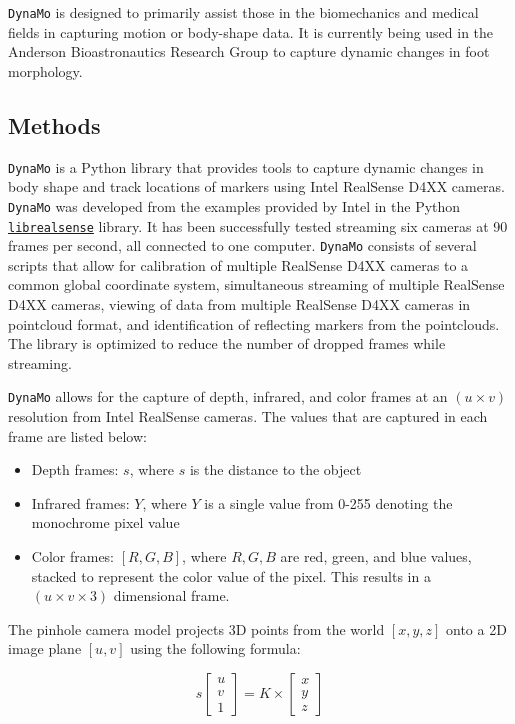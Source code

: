 \documentclass[defaultstyle,11pt]{comps}
\providecommand{\tightlist}{%
  \setlength{\itemsep}{0pt}\setlength{\parskip}{0pt}}
\begin{document}
\texttt{DynaMo} is designed to primarily assist those in the biomechanics and medical fields in capturing motion or body-shape data.
It is currently being used in the Anderson Bioastronautics Research Group to capture dynamic changes in foot morphology.

\hypertarget{methods-1}{%
\subsection{Methods}\label{methods-1}}

\texttt{DynaMo} is a Python library that provides tools to capture dynamic changes in body shape and track locations of markers using Intel RealSense D4XX cameras.
\texttt{DynaMo} was developed from the examples provided by Intel in the Python \href{https://github.com/IntelRealSense/librealsense}{\texttt{librealsense}} library. It has been successfully tested streaming six cameras at 90 frames per second, all connected to one computer.
\texttt{DynaMo} consists of several scripts that allow for calibration of multiple RealSense D4XX cameras to a common global coordinate system, simultaneous streaming of multiple RealSense D4XX cameras, viewing of data from multiple RealSense D4XX cameras in pointcloud format, and identification of reflecting markers from the pointclouds.
The library is optimized to reduce the number of dropped frames while streaming.

\texttt{DynaMo} allows for the capture of depth, infrared, and color frames at an \((u \times v)\) resolution from Intel RealSense cameras.
The values that are captured in each frame are listed below:

\begin{itemize}
\tightlist
\item
  Depth frames: \(s\), where \(s\) is the distance to the object
\item
  Infrared frames: \(Y\), where \(Y\) is a single value from 0-255 denoting the monochrome pixel value
\item
  Color frames: \([R,G,B]\), where \(R,G,B\) are red, green, and blue values, stacked to represent the color value of the pixel. This results in a \((u\times v \times 3)\) dimensional frame.
\end{itemize}

The pinhole camera model \citep{Sturm2014} projects 3D points from the world \([x,y,z]\) onto a 2D image plane \([u,v]\) using the following formula:

\[
s\begin{bmatrix}u\\v\\1\end{bmatrix} = K \times \begin{bmatrix}x\\y\\z\end{bmatrix}
\]
\end{document}
